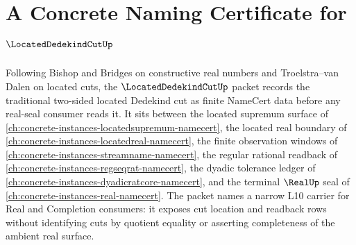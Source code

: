\chapter{A Concrete Naming Certificate for $\LocatedDedekindCutUp$}
\label{ch:concrete-instances-located-dedekind-cut-namecert}

Following Bishop and Bridges on constructive real numbers and Troelstra--van Dalen on located cuts, the $\LocatedDedekindCutUp$ packet records the traditional two-sided located Dedekind cut as finite NameCert data before any real-seal consumer reads it. It sits between the located supremum surface of \autoref{ch:concrete-instances-locatedsupremum-namecert}, the located real boundary of \autoref{ch:concrete-instances-locatedreal-namecert}, the finite observation windows of \autoref{ch:concrete-instances-streamname-namecert}, the regular rational readback of \autoref{ch:concrete-instances-regseqrat-namecert}, the dyadic tolerance ledger of \autoref{ch:concrete-instances-dyadicratcore-namecert}, and the terminal $\RealUp$ seal of \autoref{ch:concrete-instances-real-namecert}. The packet names a narrow L10 carrier for Real and Completion consumers: it exposes cut location and readback rows without identifying cuts by quotient equality or asserting completeness of the ambient real surface.

